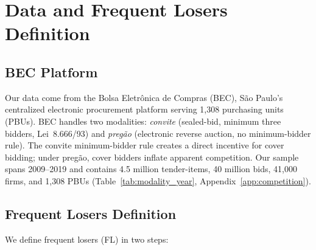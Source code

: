 

\section{Data and Frequent Losers Definition}
\label{sec:data}

\subsection{BEC Platform}
\label{sec:bec}

Our data come from the Bolsa Eletr\^onica de Compras (BEC), S\~ao
Paulo's centralized electronic procurement platform serving 1,308
purchasing units (PBUs). BEC handles two modalities:
\emph{convite} (sealed-bid, minimum three bidders, Lei~8.666/93) and
\emph{preg\~ao} (electronic reverse auction, no minimum-bidder rule).
The convite minimum-bidder rule creates a direct incentive for cover
bidding; under preg\~ao, cover bidders inflate apparent competition.
Our sample spans 2009--2019 and contains 4.5 million tender-items,
40 million bids, 41,000 firms, and 1,308 PBUs
(Table~\ref{tab:modality_year}, Appendix~\ref{app:competition}).

\subsection{Frequent Losers Definition}
\label{sec:fl_definition}

We define frequent losers (FL) in two steps:

